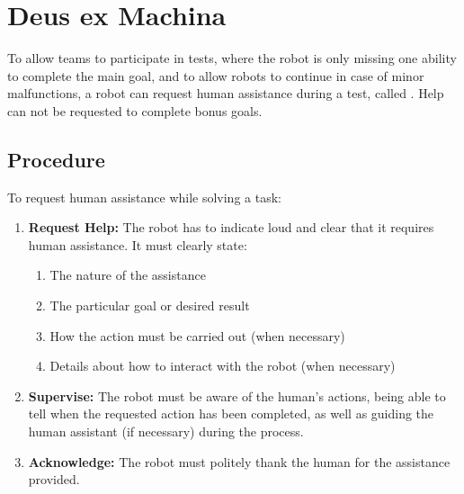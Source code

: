 \section{Deus ex Machina}
\label{sec:rules:deusexmachina}
To allow teams to participate in tests, where the robot is only missing one ability to complete the main goal, and to allow robots to continue in case of minor malfunctions, a robot can request human assistance during a test, called \DEM{}. Help can not be requested to complete bonus goals.

\subsection{Procedure}
\label{sec:rules:demprocedure}
To request human assistance while solving a task:

\begin{enumerate}
	\item \textbf{Request Help:} The robot has to indicate loud and clear that it requires human assistance. It must clearly state:
	\begin{enumerate}
		\item The nature of the assistance
		\item The particular goal or desired result
		\item How the action must be carried out (when necessary)
		\item Details about how to interact with the robot (when necessary)
	\end{enumerate}

	\item \textbf{Supervise:} The robot must be aware of the human's actions, being able to tell when the requested action has been completed, as well as guiding the human assistant (if necessary) during the process.

	\item \textbf{Acknowledge:} The robot must politely thank the human for the assistance provided.
\end{enumerate}


